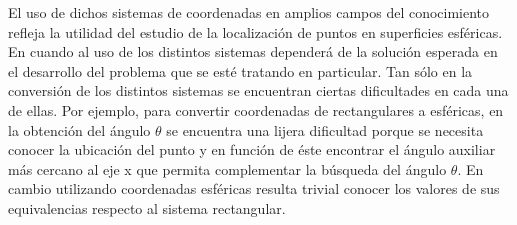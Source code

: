 
\hspace{4mm} El uso de dichos sistemas de coordenadas en amplios campos del conocimiento refleja la utilidad del estudio de la localización de puntos en superficies esféricas. En cuando al uso de los distintos sistemas dependerá de la solución esperada en el desarrollo del problema que se esté tratando en particular. Tan sólo en la conversión de los distintos sistemas se encuentran ciertas dificultades en cada una de ellas. Por ejemplo, para convertir coordenadas de rectangulares a esféricas, en la obtención del ángulo ${\theta}$ se encuentra una lijera dificultad porque se necesita conocer la ubicación del punto y en función de éste encontrar el ángulo auxiliar más cercano al eje x que permita complementar la búsqueda del ángulo ${\theta}$. En cambio utilizando coordenadas esféricas resulta trivial conocer los valores de sus equivalencias respecto al sistema rectangular.
